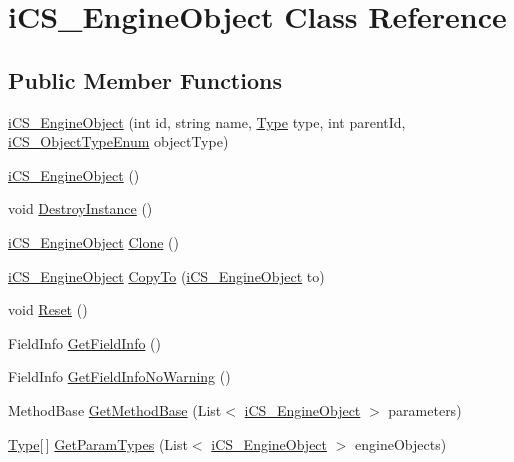 \hypertarget{classi_c_s___engine_object}{\section{i\+C\+S\+\_\+\+Engine\+Object Class Reference}
\label{classi_c_s___engine_object}
}
\subsection*{Public Member Functions}
\begin{DoxyCompactItemize}
\item 
\hyperlink{classi_c_s___engine_object_a464674150f880b2f36ed7ddd6eb81829}{i\+C\+S\+\_\+\+Engine\+Object} (int id, string name, \hyperlink{i_c_s___object_type_enum_8cs_ae6c3dd6d8597380b56d94908eb431547aa1fa27779242b4902f7ae3bdd5c6d508}{Type} type, int parent\+Id, \hyperlink{i_c_s___object_type_enum_8cs_ae6c3dd6d8597380b56d94908eb431547}{i\+C\+S\+\_\+\+Object\+Type\+Enum} object\+Type)
\item 
\hyperlink{classi_c_s___engine_object_a69435536dcdb5d2dfa0998fb79bd05f6}{i\+C\+S\+\_\+\+Engine\+Object} ()
\item 
void \hyperlink{classi_c_s___engine_object_ac391e2b8f8ce57619b8e65ef17f26b7f}{Destroy\+Instance} ()
\item 
\hyperlink{classi_c_s___engine_object}{i\+C\+S\+\_\+\+Engine\+Object} \hyperlink{classi_c_s___engine_object_a086581c5bf69e13d745c5a4f4c3b6501}{Clone} ()
\item 
\hyperlink{classi_c_s___engine_object}{i\+C\+S\+\_\+\+Engine\+Object} \hyperlink{classi_c_s___engine_object_a3881573afbd4728659ccb4935f3d3af9}{Copy\+To} (\hyperlink{classi_c_s___engine_object}{i\+C\+S\+\_\+\+Engine\+Object} to)
\item 
void \hyperlink{classi_c_s___engine_object_a07f700858a1c142e4ef65884fff3157c}{Reset} ()
\item 
Field\+Info \hyperlink{classi_c_s___engine_object_a3c087b3362ae8a5a1f07ce9da7316fec}{Get\+Field\+Info} ()
\item 
Field\+Info \hyperlink{classi_c_s___engine_object_a37ac48112ef8521642d70b1d1ddcfddd}{Get\+Field\+Info\+No\+Warning} ()
\item 
Method\+Base \hyperlink{classi_c_s___engine_object_aef8c790ea64969ae003fcf0b72ea72f0}{Get\+Method\+Base} (List$<$ \hyperlink{classi_c_s___engine_object}{i\+C\+S\+\_\+\+Engine\+Object} $>$ parameters)
\item 
\hyperlink{i_c_s___object_type_enum_8cs_ae6c3dd6d8597380b56d94908eb431547aa1fa27779242b4902f7ae3bdd5c6d508}{Type}\mbox{[}$\,$\mbox{]} \hyperlink{classi_c_s___engine_object_a73ad1c401fd9887b56c45dcf735289d2}{Get\+Param\+Types} (List$<$ \hyperlink{classi_c_s___engine_object}{i\+C\+S\+\_\+\+Engine\+Object} $>$ engine\+Objects)
\end{DoxyCompactItemize}
